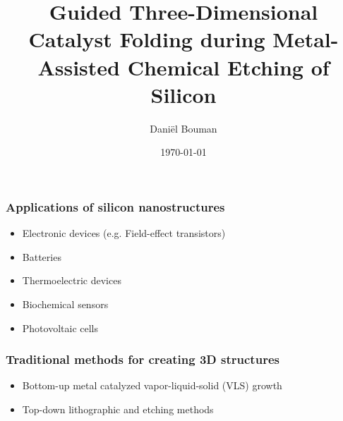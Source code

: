 \documentclass{beamer}
\title[3D folding MaCe]{Guided Three-Dimensional Catalyst Folding during Metal-Assisted Chemical Etching of Silicon}
\institute[TU Delft]{Delft University of Technology}
\author{Dani\"{e}l Bouman}
\date{\today}
\newcommand*\titleTOC{Outline}
\begin{document}
{
%
\frame{\titlepage}
}

{
}
\begin{frame}\frametitle{Applications of silicon nanostructures}
	\begin{itemize}
	    \item Electronic devices (e.g. Field-effect transistors)
	    \item Batteries
	    \item Thermoelectric devices
	    \item Biochemical sensors
	    \item Photovoltaic cells
	\end{itemize}
\end{frame}

\begin{frame}\frametitle{Traditional methods for creating 3D structures}
    \begin{itemize}
        \item Bottom-up metal catalyzed vapor-liquid-solid (VLS) growth
        \item Top-down lithographic and etching methods
    \end{itemize}
\end{frame}
\end{document}
